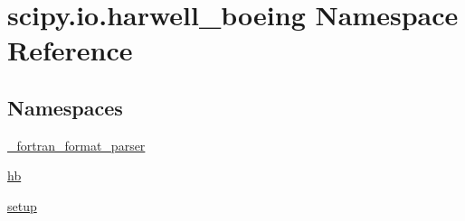 \hypertarget{namespacescipy_1_1io_1_1harwell__boeing}{}\section{scipy.\+io.\+harwell\+\_\+boeing Namespace Reference}
\label{namespacescipy_1_1io_1_1harwell__boeing}
\subsection*{Namespaces}
\begin{DoxyCompactItemize}
\item 
 \hyperlink{namespacescipy_1_1io_1_1harwell__boeing_1_1__fortran__format__parser}{\+\_\+fortran\+\_\+format\+\_\+parser}
\item 
 \hyperlink{namespacescipy_1_1io_1_1harwell__boeing_1_1hb}{hb}
\item 
 \hyperlink{namespacescipy_1_1io_1_1harwell__boeing_1_1setup}{setup}
\end{DoxyCompactItemize}
